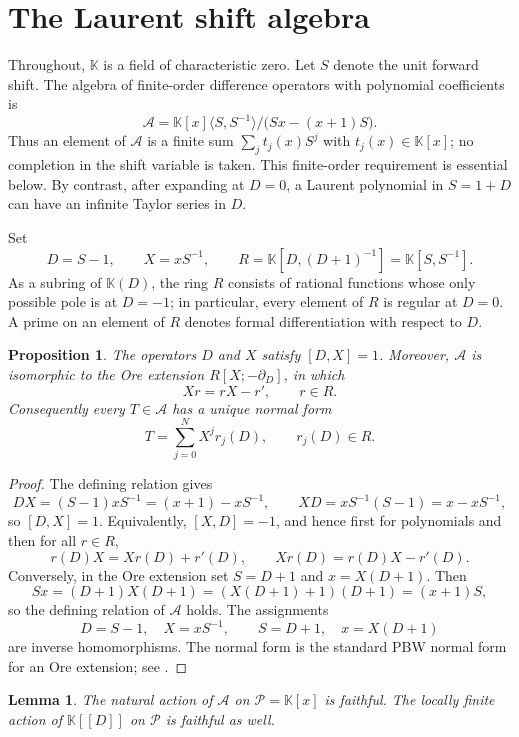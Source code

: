 \documentclass[11pt,reqno]{amsart}
\numberwithin{equation}{section}
\newtheorem{proposition}[theorem]{Proposition}
\newtheorem{lemma}[theorem]{Lemma}
\theoremstyle{definition}
\theoremstyle{remark}
\newcommand{\K}{\mathbb K}
\newcommand{\algA}{\mathcal A}
\newcommand{\calP}{\mathcal P}
\begin{document}
\section{The Laurent shift algebra}

Throughout, $\K$ is a field of characteristic zero.  Let $S$ denote the unit forward shift.  The algebra of finite-order difference operators with polynomial coefficients is
\begin{equation}\label{eq:shift-algebra}
 \algA=\K[x]\langle S,S^{-1}\rangle\big/\bigl(Sx-(x+1)S\bigr).
\end{equation}
Thus an element of $\algA$ is a finite sum $\sum_j t_j(x)S^j$ with $t_j(x)\in\K[x]$; no completion in the shift variable is taken.  This finite-order requirement is essential below.  By contrast, after expanding at $D=0$, a Laurent polynomial in $S=1+D$ can have an infinite Taylor series in $D$.

Set
\[
 D=S-1,
 \qquad
 X=xS^{-1},
 \qquad
 R=\K[D,(D+1)^{-1}]=\K[S,S^{-1}].
\]
As a subring of $\K(D)$, the ring $R$ consists of rational functions whose only possible pole is at $D=-1$; in particular, every element of $R$ is regular at $D=0$.  A prime on an element of $R$ denotes formal differentiation with respect to $D$.

\begin{proposition}\label{prop:ore}
The operators $D$ and $X$ satisfy $[D,X]=1$.  Moreover, $\algA$ is isomorphic to the Ore extension $R[X;-\partial_D]$, in which
\[
 Xr=rX-r',\qquad r\in R.
\]
Consequently every $T\in\algA$ has a unique normal form
\[
 T=\sum_{j=0}^{N}X^j r_j(D),
 \qquad
 r_j(D)\in R.
\]
\end{proposition}

\begin{proof}
The defining relation gives
\[
 DX=(S-1)xS^{-1}=(x+1)-xS^{-1},
 \qquad
 XD=xS^{-1}(S-1)=x-xS^{-1},
\]
so $[D,X]=1$.  Equivalently, $[X,D]=-1$, and hence first for polynomials and then for all $r\in R$,
\[
 r(D)X=Xr(D)+r'(D),
 \qquad
 Xr(D)=r(D)X-r'(D).
\]
Conversely, in the Ore extension set $S=D+1$ and $x=X(D+1)$.  Then
\[
 Sx=(D+1)X(D+1)=(X(D+1)+1)(D+1)=(x+1)S,
\]
so the defining relation of $\algA$ holds.  The assignments
\[
 D=S-1,
 \quad X=xS^{-1},
 \qquad
 S=D+1,
 \quad x=X(D+1)
\]
are inverse homomorphisms.  The normal form is the standard PBW normal form for an Ore extension; see \cite{Ore1933,McConnellRobson2001}.
\end{proof}

\begin{lemma}\label{lem:faithful}
The natural action of $\algA$ on $\calP=\K[x]$ is faithful.  The locally finite action of $\K[[D]]$ on $\calP$ is faithful as well.
\end{lemma}
\end{document}
